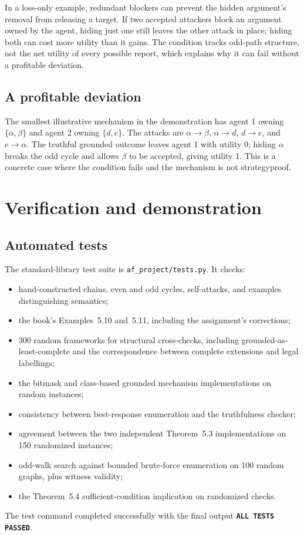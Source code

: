 \documentclass[11pt,a4paper]{article}
\newcommand{\code}[1]{\texttt{\small #1}}
\newcommand{\result}[1]{\textbf{\color{navy}#1}}
\begin{document}
In a loss-only example, redundant blockers can prevent the hidden argument's removal from releasing a target. If two accepted attackers block an argument owned by the agent, hiding just one still leaves the other attack in place; hiding both can cost more utility than it gains. The condition tracks odd-path structure, not the net utility of every possible report, which explains why it can fail without a profitable deviation.

\subsection{A profitable deviation}
The smallest illustrative mechanism in the demonstration has agent 1 owning $\{\alpha,\beta\}$ and agent 2 owning $\{d,e\}$. The attacks are $\alpha\to\beta$, $\alpha\to d$, $d\to e$, and $e\to\alpha$. The truthful grounded outcome leaves agent 1 with utility 0; hiding $\alpha$ breaks the odd cycle and allows $\beta$ to be accepted, giving utility 1. This is a concrete case where the condition fails and the mechanism is not strategyproof.

\section{Verification and demonstration}

\subsection{Automated tests}
The standard-library test suite is \code{af\_project/tests.py}. It checks:
\begin{itemize}
\item hand-constructed chains, even and odd cycles, self-attacks, and examples distinguishing semantics;
\item the book's Examples~5.10 and~5.11, including the assignment's corrections;
\item 300 random frameworks for structural cross-checks, including grounded-as-least-complete and the correspondence between complete extensions and legal labellings;
\item the bitmask and class-based grounded mechanism implementations on random instances;
\item consistency between best-response enumeration and the truthfulness checker;
\item agreement between the two independent Theorem~5.3 implementations on 150 randomized instances;
\item odd-walk search against bounded brute-force enumeration on 100 random graphs, plus witness validity;
\item the Theorem~5.4 sufficient-condition implication on randomized checks.
\end{itemize}
The test command completed successfully with the final output \result{\code{ALL TESTS PASSED}}.
\end{document}
